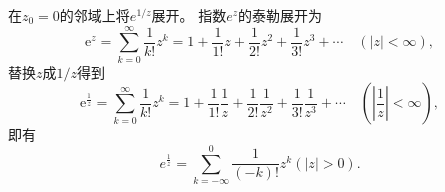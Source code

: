 \begin{examplebox}{在$z_0 = 0$的邻域上将$e^{1/z}$展开。}
指数$e^z$的泰勒展开为
\[
    \mathrm{e}^z=\sum_{k=0}^{\infty} \frac{1}{k !} z^k=1+\frac{1}{1 !} z+\frac{1}{2 !} z^2+\frac{1}{3 !} z^3+\cdots \quad(|z|<\infty),    
\]
替换$z$成$1/z$得到
\[
    \mathrm{e}^{\frac{1}{z}}=\sum_{k=0}^{\infty} \frac{1}{k !} z^k=1+\frac{1}{1 !} \frac{1}{z}+\frac{1}{2 !} \frac{1}{z^2}+\frac{1}{3 !} \frac{1}{z^3}+\cdots \quad(|\frac{1}{z}|<\infty),    
\]
即有
\[
e^{\frac{1}{z}} = \sum_{k=-\infty}^{0} \frac{1}{(-k)!} z^k ( |z| > 0) .
\]
\end{examplebox}